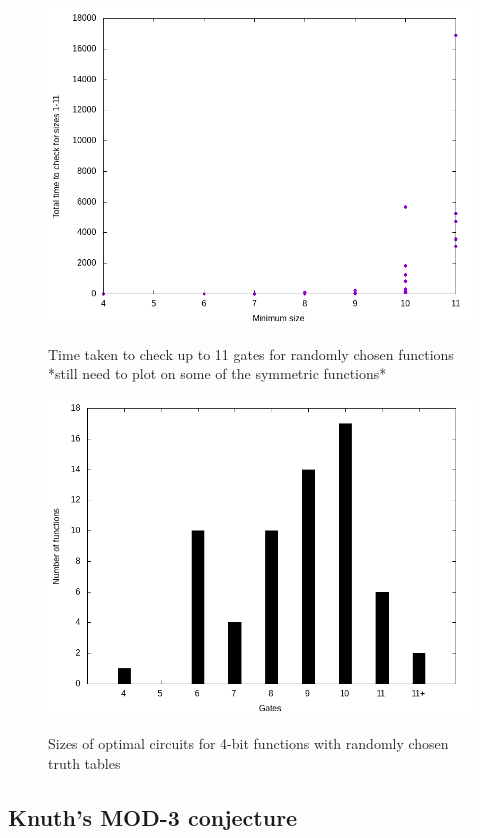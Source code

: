 \documentclass{article}
\begin{document}
\begin{figure}[!ht]
  \includegraphics[width=\textwidth]{images/random/4bit_scatter.png}
  \label{fig:4rand_scatter}
  \caption{Time taken to check up to 11 gates for randomly chosen functions *still need to plot on some of the symmetric functions*}
\end{figure}
\begin{figure}[!ht]
  \includegraphics[width=\textwidth]{images/random/4bit_sizes.png}
  \label{fig:4rand_sizes}
  \caption{Sizes of optimal circuits for 4-bit functions with randomly chosen truth tables}

\end{figure}

\subsection{Knuth's MOD-3 conjecture}
\end{document}
